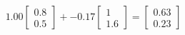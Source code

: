 \documentclass[preview]{standalone}
\begin{document}
\begin{align*}
1.00 \begin{bmatrix} 0.8 \\ 0.5 \end{bmatrix} + -0.17 \begin{bmatrix} 1 \\ 1.6 \end{bmatrix} = \begin{bmatrix} 0.63 \\ 0.23 \end{bmatrix}
\end{align*}
\end{document}
